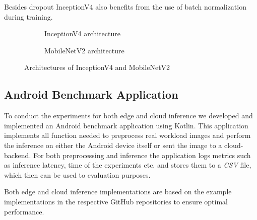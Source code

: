 Besides dropout InceptionV4 also benefits from the use of batch normalization during training.

\begin{figure}[!htb]
\centering
\begin{subfigure}[t]{0.47\textwidth}
   \resizebox{.99\linewidth}{!}{}
   \caption{InceptionV4 architecture \cite{InceptionV4}}
   \label{fig:inceptionv4Archi} 
\end{subfigure}%
\begin{subfigure}[t]{0.47\textwidth}
   \resizebox{.99\linewidth}{!}{}
   \caption{MobileNetV2 architecture \cite{DBLP:journals/corr/abs-1801-04381}}
   \label{fig:MobileNetArchi}
\end{subfigure}

\caption{Architectures of InceptionV4 and MobileNetV2}
\end{figure}



\subsection{Android Benchmark Application}
\label{chap:androidApp}
To conduct the experiments for both edge and cloud inference we developed and implemented an Android benchmark application using Kotlin.
This application implements all function needed to preprocess real workload images and perform the inference on either the Android device itself or sent the image to a cloud-backend.
For both preprocessing and inference the application logs metrics such as inference latency, time of the experiments etc. and stores them to a \emph{CSV} file, which then can be used to evaluation purposes.

Both edge and cloud inference implementations are based on the example implementations in the respective GitHub repositories to ensure optimal performance. 


